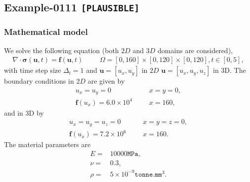%
\clearpage
%
\subsection{Example-0111 \texttt{[PLAUSIBLE]}}
%
%
\subsubsection{Mathematical model}
%
We solve the following equation (both $2D$ and $3D$ domains are considered),
%
\begin{align}
    \nabla \cdot \boldsymbol{\sigma} (\boldsymbol{u}, t) = \boldsymbol{f} (\boldsymbol{u}, t) & &&\Omega = [0, 160] \times [0, 120] \times [0, 120], t \in [0, 5],
\end{align}
%
with time step size $\Delta_t = 1$ and $\boldsymbol{u} = [u_x,u_y]$ in $2D$ $\boldsymbol{u} = [u_x,u_y,u_z]$ in 3D. The boundary conditions in $2D$ are given by
%
\begin{align}
    u_x = u_y = 0 & &&x = y = 0, \\
		\boldsymbol{f} (u_x) = 6.0 \times 10^{4} & &&x = 160,
\end{align}
%
and in 3D by
\begin{align}
    u_x = u_y = u_z =0 & &&x = y = z =0, \\
		\boldsymbol{f} (u_x) = 7.2 \times 10^{6} & &&x = 160.
\end{align}
The material parameters are
\begin{align}
    E = & 10000\texttt{MPa}, \\
    \nu = & 0.3, \\
		\rho = & 5 \times 10^{-9}\texttt{tonne.mm$^3$}.
\end{align}
%
%
